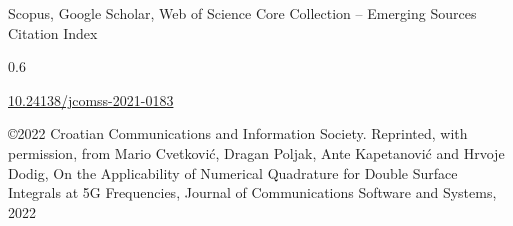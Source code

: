 \begin{description}[leftmargin=!,labelwidth=\widthof{\bfseries Volume and number}]
    \item[Databases] Scopus, Google Scholar, Web of Science Core Collection -- Emerging Sources Citation Index
    \item[Impact factor] 0.6
    \item[DOI] \href{https://doi.org/10.24138/jcomss-2021-0183}{\url{10.24138/jcomss-2021-0183}}
    \item[Copyright notice] \copyright 2022 Croatian Communications and Information Society. Reprinted, with permission, from Mario Cvetković, Dragan Poljak, Ante Kapetanović and Hrvoje Dodig, On the Applicability of Numerical Quadrature for Double Surface Integrals at 5G Frequencies, Journal of Communications Software and Systems, 2022
\end{description}

\cleardoublepage


